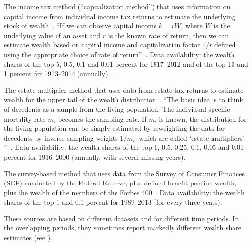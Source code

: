 \bi
\item
The income tax method (``capitalization method'') that uses information on capital income from individual income tax returns to estimate the underlying stock of wealth~\cite{SaezZucman2014,WID2017}. ``If we can observe capital income $k = rW$, where $W$ is the underlying value of an asset and $r$ is the known rate of return, then we can estimate wealth based on capital income and capitalization factor $1/r$ defined using the appropriate choice of rate of return''~\cite[p.~54] {kopczuk2015we}. Data availability: the wealth shares of the top 5, 0.5, 0.1 and 0.01 percent for 1917--2012 and of the top 10 and 1 percent for 1913--2014 (annually).
\item
The estate multiplier method that uses data from estate tax returns to estimate wealth for the upper tail of the wealth distribution~\cite{kopczuk2004top}. ``The basic idea is to think of decedents as a sample from the living population. The individual-specific mortality rate $m_i$ becomes the sampling rate. If $m_i$ is known, the distribution for the living population can be simply estimated by reweighting the data for decedents by inverse sampling weights $1/m_i$, which are called `estate multipliers' ''~\cite[p.~53] {kopczuk2015we}. Data availability: the wealth shares of the top 1, 0.5, 0.25, 0.1, 0.05 and 0.01 percent for 1916--2000 (annually, with several missing years).
\item
The survey-based method that uses data from the Survey of Consumer Finances (SCF) conducted by the Federal Reserve, plus defined-benefit pension wealth, plus the wealth of the members of the Forbes 400~\cite{bricker2016measuring2}. Data availability: the wealth shares of the top 1 and 0.1 percent for 1989--2013 (for every three years).
\ei

These sources are based on different datasets and for different time periods. In the overlapping periods, they sometimes report markedly different wealth share estimates (see ).

